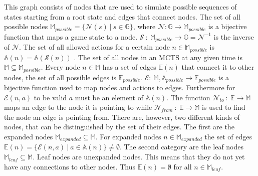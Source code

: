 \documentclass[12pt]{article}
\begin{document}
This graph consists of nodes that are used to simulate possible sequences of states starting from a root state and edges that connect nodes. The set of all possible nodes \(\mathbb{M}_{possible} = \{\mathcal{N}(s)~|~ s \in \mathbb{G}\}\), where \(\mathcal{N}:\mathbb{G}\to\mathbb{M}_{possible}\) is a bijective function that maps a game state to a node. \(\mathcal{S}~:~\mathbb{M}_{possible}\to\mathbb{G} = \mathcal{N}^{-1}\) is the inverse of \(\mathcal{N}\). The set of all allowed actions for a certain node \(n\in\mathbb{M}_{possible}\) is \(\mathbb{A}(n) = \mathbb{A}(\mathcal{S}(n))\) . The set of all nodes in an MCTS at any given time is \(\mathbb{M} \subseteq \mathbb{M}_{possible}\). Every node \(n \in \mathbb{M}\) has a set of edges \(\mathbb{E}(n)\) that connect it to other nodes, the set of all possible edges is \(\mathbb{E}_{possible}\). \(\mathcal{E}:~\mathbb{M}, \mathbb{A}_{possible} \to \mathbb{E}_{possible}\) is a bijective function used to map nodes and actions to edges. Furthermore for \(\mathcal{E}(n, a)\) to be valid \(a\) must be an element of \(\mathbb{A}(n)\).  The function \(\mathcal{N}_{to}~:~\mathbb{E}\to\mathbb{M}\) maps an edge to the node it is pointing to while \(\mathcal{N}_{from}~:~\mathbb{E}\to\mathbb{M}\) is used to find the node an edge is pointing from.
There are, however, two different kinds of nodes, that can be distinguished by the set of their edges. The first are the expanded nodes \(\mathbb{M}_{expanded}\subseteq\mathbb{M}\). For expanded nodes \( n\in \mathbb{M}_{expanded}\) the set of edges \(\mathbb{E}(n) = \{\mathcal{E}(n,a)~|~ a\in \mathbb{A}(n)\} \neq \emptyset\). The second category are the leaf nodes \(\mathbb{M}_{leaf} \subseteq \mathbb{M}\). Leaf nodes are unexpanded nodes. This means that they do not yet have any connections to other nodes. Thus \(\mathbb{E}(n) = \emptyset\) for all \(n \in \mathbb{M}_{leaf}\).
\end{document}
